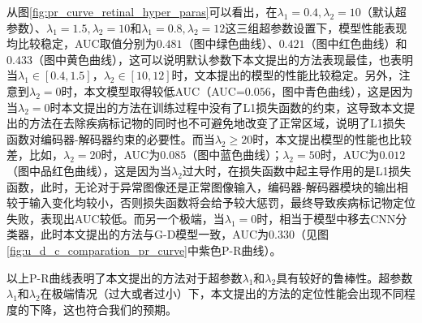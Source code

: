 从图\ref{fig:pr_curve_retinal_hyper_paras}可以看出，在$\lambda_{1}=0.4, \lambda_{2}=10$（默认超参数）、$\lambda_{1}=1.5,\lambda_{2}=10$和$\lambda_{1}=0.8,\lambda_{2}=12$这三组超参数设置下，模型性能表现均比较稳定，AUC取值分别为$0.481$（图中绿色曲线）、$0.421$（图中红色曲线）和$0.433$（图中黄色曲线），这可以说明默认参数下本文提出的方法表现最佳，也表明当$\lambda_{1}\in [0.4,1.5]$，$\lambda_{2}\in [10,12]$时，文本提出的模型的性能比较稳定。另外，注意到$\lambda_{2}=0$时，本文模型取得较低AUC（AUC=$0.056$，图中青色曲线），这是因为当$\lambda_{2}=0$时本文提出的方法在训练过程中没有了L1损失函数的约束，这导致本文提出的方法在去除疾病标记物的同时也不可避免地改变了正常区域，说明了L1损失函数对编码器-解码器约束的必要性。而当$\lambda_{2}\geq 20$时，本文提出模型的性能也比较差，比如，$\lambda_{2}=20$时，AUC为$0.085$（图中蓝色曲线）；$\lambda_{2}=50$时，AUC为$0.012$（图中品红色曲线），这是因为当$\lambda_{2}$过大时，在损失函数中起主导作用的是L1损失函数，此时，无论对于异常图像还是正常图像输入，编码器-解码器模块的输出相较于输入变化均较小，否则损失函数将会给予较大惩罚，最终导致疾病标记物定位失败，表现出AUC较低。而另一个极端，当$\lambda_{1}=0$时，相当于模型中移去CNN分类器，此时本文提出的方法与G-D模型一致，AUC为$0.330$（见图\ref{fig:u_d_c_comparation_pr_curve}中紫色P-R曲线）。

以上P-R曲线表明了本文提出的方法对于超参数$\lambda_{1}$和$\lambda_{2}$具有较好的鲁棒性。超参数$\lambda_{1}$和$\lambda_{2}$在极端情况（过大或者过小）下，本文提出的方法的定位性能会出现不同程度的下降，这也符合我们的预期。
